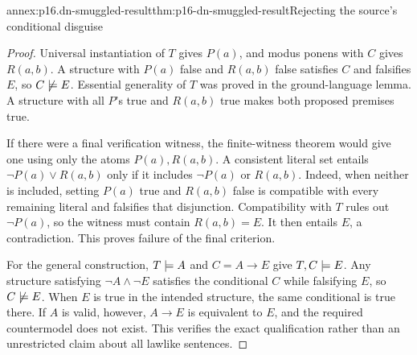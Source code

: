 \begin{annexitem}{annex:p16.dn-smuggled-result}{thm:p16-dn-smuggled-result}{Rejecting the source's conditional disguise}
\begin{proof}
Universal instantiation of \(T\)
gives \(P(a)\), and modus ponens
with \(C\) gives \(R(a,b)\).
A structure with \(P(a)\) false
and \(R(a,b)\) false satisfies
\(C\) and falsifies \(E\), so
\(C\not\models E\). Essential
generality of \(T\) was proved
in the ground-language lemma.
A structure with all \(P\)'s
true and \(R(a,b)\) true makes
both proposed premises true.

If there were a final verification
witness, the finite-witness theorem
would give one using only the
atoms \(P(a),R(a,b)\).
A consistent literal set entails
\(\neg P(a)\lor R(a,b)\) only
if it includes \(\neg P(a)\)
or \(R(a,b)\). Indeed, when
neither is included, setting
\(P(a)\) true and \(R(a,b)\)
false is compatible with every
remaining literal and falsifies
that disjunction.
Compatibility with \(T\) rules
out \(\neg P(a)\), so the witness
must contain \(R(a,b)=E\).
It then entails \(E\), a
contradiction. This proves failure
of the final criterion.

For the general construction,
\(T\models A\) and
\(C=A\to E\) give \(T,C\models E\).
Any structure satisfying
\(\neg A\land\neg E\) satisfies
the conditional \(C\) while
falsifying \(E\), so \(C\not\models E\).
When \(E\) is true in the intended
structure, the same conditional
is true there. If \(A\) is valid,
however, \(A\to E\) is equivalent
to \(E\), and the required
countermodel does not exist.
This verifies the exact
qualification rather than an
unrestricted claim about all
lawlike sentences.
\end{proof}
\end{annexitem}


